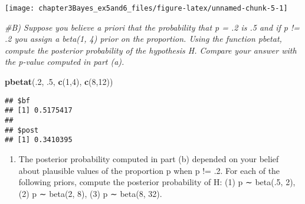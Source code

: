 \documentclass[]{tufte-handout}
\newenvironment{Shaded}{}{}
\newcommand{\KeywordTok}[1]{\textcolor[rgb]{0.00,0.44,0.13}{\textbf{{#1}}}}
\newcommand{\DecValTok}[1]{\textcolor[rgb]{0.25,0.63,0.44}{{#1}}}
\newcommand{\CommentTok}[1]{\textcolor[rgb]{0.38,0.63,0.69}{\textit{{#1}}}}
\newcommand{\NormalTok}[1]{{#1}}
\begin{document}
\texttt{[image: chapter3Bayes\_ex5and6\_files/figure-latex/unnamed-chunk-5-1]}

\begin{Shaded}
\begin{Highlighting}[]
\CommentTok{#B) Suppose you believe a priori that the probability that p = .2 is .5 and if p != .2 you assign a beta(1, 4) prior on the proportion. Using the function pbetat, compute the posterior probability of the hypothesis H. Compare your answer with the p-value computed in part (a).}

\KeywordTok{pbetat}\NormalTok{(.}\DecValTok{2}\NormalTok{, .}\DecValTok{5}\NormalTok{, }\KeywordTok{c}\NormalTok{(}\DecValTok{1}\NormalTok{,}\DecValTok{4}\NormalTok{), }\KeywordTok{c}\NormalTok{(}\DecValTok{8}\NormalTok{,}\DecValTok{12}\NormalTok{))}
\end{Highlighting}
\end{Shaded}

\begin{verbatim}
## $bf
## [1] 0.5175417
## 
## $post
## [1] 0.3410395
\end{verbatim}

\begin{Shaded}
\end{Shaded}

\begin{enumerate}
\def\labelenumi{\alph{enumi})}
\setcounter{enumi}{2}
\itemsep1pt\parskip0pt
\item
  The posterior probability computed in part (b) depended on your belief
  about plausible values of the proportion p when p != .2. For each of
  the following priors, compute the posterior probability of H: (1) p ∼
  beta(.5, 2), (2) p ∼ beta(2, 8), (3) p ∼ beta(8, 32).
\end{enumerate}
\end{document}
